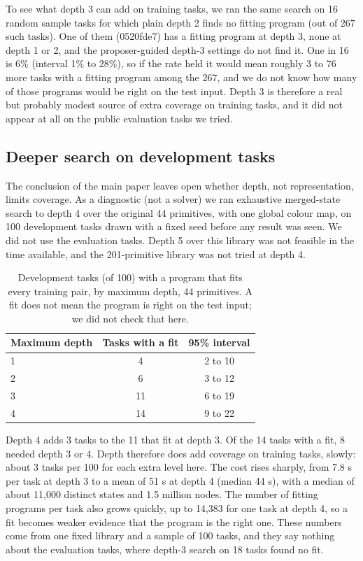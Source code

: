 \documentclass[sigconf,nonacm]{acmart}
\begin{document}
To see what depth 3 can add on training tasks, we ran the same search on 16 random sample tasks for which plain depth 2 finds no fitting program (out of 267 such tasks). One of them (0520fde7) has a fitting program at depth 3, none at depth 1 or 2, and the proposer-guided depth-3 settings do not find it. One in 16 is 6\% (interval 1\% to 28\%), so if the rate held it would mean roughly 3 to 76 more tasks with a fitting program among the 267, and we do not know how many of those programs would be right on the test input. Depth 3 is therefore a real but probably modest source of extra coverage on training tasks, and it did not appear at all on the public evaluation tasks we tried. 


\subsection{Deeper search on development tasks}\label{sec:deeper}

The conclusion of the main paper leaves open whether depth, not representation, limits coverage. As a diagnostic (not a solver) we ran exhaustive merged-state search to depth 4 over the original 44 primitives, with one global colour map, on 100 development tasks drawn with a fixed seed before any result was seen. We did not use the evaluation tasks. Depth 5 over this library was not feasible in the time available, and the 201-primitive library was not tried at depth 4.

\begin{table}[h]
\centering\small
\caption{Development tasks (of 100) with a program that fits every training pair, by maximum depth, 44 primitives. A fit does not mean the program is right on the test input; we did not check that here.}
\begin{tabular}{lcc}
\toprule
Maximum depth & Tasks with a fit & 95\% interval \\
\midrule
1 & 4 & 2 to 10 \\
2 & 6 & 3 to 12 \\
3 & 11 & 6 to 19 \\
4 & 14 & 9 to 22 \\
\bottomrule
\end{tabular}
\end{table}

Depth 4 adds 3 tasks to the 11 that fit at depth 3. Of the 14 tasks with a fit, 8 needed depth 3 or 4. Depth therefore does add coverage on training tasks, slowly: about 3 tasks per 100 for each extra level here. The cost rises sharply, from 7.8 s per task at depth 3 to a mean of 51 s at depth 4 (median 44 s), with a median of about 11,000 distinct states and 1.5 million nodes. The number of fitting programs per task also grows quickly, up to 14,383 for one task at depth 4, so a fit becomes weaker evidence that the program is the right one. These numbers come from one fixed library and a sample of 100 tasks, and they say nothing about the evaluation tasks, where depth-3 search on 18 tasks found no fit.
\end{document}
